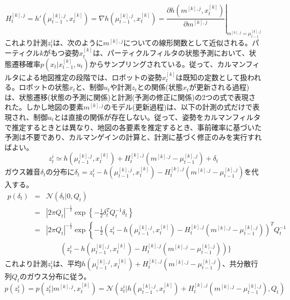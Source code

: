 \documentclass[dvipdfmx,a4paper]{jsarticle}
\begin{document}
\begin{equation}
	H_t^{[k], j} = h'(\mu_{t - 1}^{[k], j}, x_t^{[k]}) = \nabla h(\mu_{t - 1}^{[k], j}, x_t^{[k]}) = \left. \frac{\partial h(m^{[k], j}, x_t^{[k]})}{\partial m^{[k], j}} \right|_{m^{[k], j} = \mu_{t - 1}^{[k], j}}
\end{equation}
これより計測$z_t^i$は、次のように$m^{[k], j}$についての線形関数として近似される。パーティクル$k$がもつ姿勢$x_t^{[k]}$は、パーティクルフィルタの状態予測において、状態遷移確率$p(x_t | x_{t - 1}^{[k]}, u_t)$からサンプリングされている。従って、カルマンフィルタによる地図推定の段階では、ロボットの姿勢$x_t^{[k]}$は既知の定数として扱われる。ロボットの状態$x_t$と、制御$u_t$や計測$z_t$との関係(状態$x_t$が更新される過程)は、状態遷移(状態の予測に関係)と計測(予測の修正に関係)の2つの式で表現された。しかし地図の要素$m^{[k], j}$のモデル(更新過程)は、以下の計測の式だけで表現され、制御$u_t$とは直接の関係が存在しない。従って、姿勢をカルマンフィルタで推定するときとは異なり、地図の各要素を推定するとき、事前確率に基づいた予測は不要であり、カルマンゲインの計算と、計測に基づく修正のみを実行すればよい。
\begin{equation}
	z_t^i \simeq h(\mu_{t - 1}^{[k], j}, x_t^{[k]}) + H_t^{[k], j} \left( m^{[k], j} - \mu_{t - 1}^{[k], j} \right) + \delta_t
\end{equation}
ガウス雑音$\delta_t$の分布に$\delta_t = z_t^i - h(\mu_{t - 1}^{[k], j}, x_t^{[k]}) - H_t^{[k], j} \left( m^{[k], j} - \mu_{t - 1}^{[k], j} \right)$を代入する。
\begin{eqnarray}
	p(\delta_t) &=& \mathcal{N}(\delta_t | 0, Q_t) \nonumber \\
	&=& |2 \pi Q_t|^{-\frac{1}{2}} \exp \left\{ -\frac{1}{2} \delta_t^T Q_t^{-1} \delta_t \right\} \nonumber \\
	&=& |2 \pi Q_t|^{-\frac{1}{2}} \exp \left\{ -\frac{1}{2} \left( z_t^i - h(\mu_{t - 1}^{[k], j}, x_t^{[k]}) - H_t^{[k], j} \left( m^{[k], j} - \mu_{t - 1}^{[k], j} \right) \right)^T Q_t^{-1} \right. \nonumber \\
	&& \qquad \left( z_t^i - h(\mu_{t - 1}^{[k], j}, x_t^{[k]}) - H_t^{[k], j} \left( m^{[k], j} - \mu_{t - 1}^{[k], j} \right) \right) \bigg\} \nonumber
\end{eqnarray}
これより計測$z_t^i$は、平均$h(\mu_{t - 1}^{[k], j}, x_t^{[k]}) + H_t^{[k], j} \left( m^{[k], j} - \mu_{t - 1}^{[k], j} \right)$、共分散行列$Q_t$のガウス分布に従う。
\begin{equation}
	p(z_t^i) = p(z_t^i | m^{[k], j}, x_t^{[k]}) = \mathcal{N} \left( z_t^i | h(\mu_{t - 1}^{[k], j}, x_t^{[k]}) + H_t^{[k], j} \left( m^{[k], j} - \mu_{t - 1}^{[k], j} \right), Q_t \right)
\end{equation}
\end{document}

